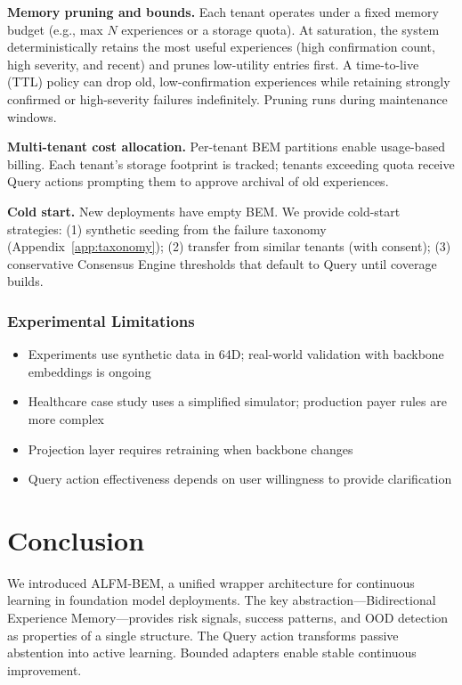 \documentclass[twoside,11pt]{article}
\begin{document}
\textbf{Memory pruning and bounds.} Each tenant operates under a fixed memory budget (e.g., max $N$ experiences or a storage quota). At saturation, the system deterministically retains the most useful experiences (high confirmation count, high severity, and recent) and prunes low-utility entries first. A time-to-live (TTL) policy can drop old, low-confirmation experiences while retaining strongly confirmed or high-severity failures indefinitely. Pruning runs during maintenance windows.

\textbf{Multi-tenant cost allocation.} Per-tenant BEM partitions enable usage-based billing. Each tenant's storage footprint is tracked; tenants exceeding quota receive Query actions prompting them to approve archival of old experiences.

\textbf{Cold start.} New deployments have empty BEM. We provide cold-start strategies: (1) synthetic seeding from the failure taxonomy (Appendix~\ref{app:taxonomy}); (2) transfer from similar tenants (with consent); (3) conservative Consensus Engine thresholds that default to Query until coverage builds.

\subsubsection{Experimental Limitations}

\begin{itemize}
    \item Experiments use synthetic data in 64D; real-world validation with backbone embeddings is ongoing
    \item Healthcare case study uses a simplified simulator; production payer rules are more complex
    \item Projection layer requires retraining when backbone changes
    \item Query action effectiveness depends on user willingness to provide clarification
\end{itemize}

\section{Conclusion}
\label{sec:conclusion}

We introduced ALFM-BEM, a unified wrapper architecture for continuous learning in foundation model deployments. The key abstraction---Bidirectional Experience Memory---provides risk signals, success patterns, and OOD detection as properties of a single structure. The Query action transforms passive abstention into active learning. Bounded adapters enable stable continuous improvement.
\end{document}
